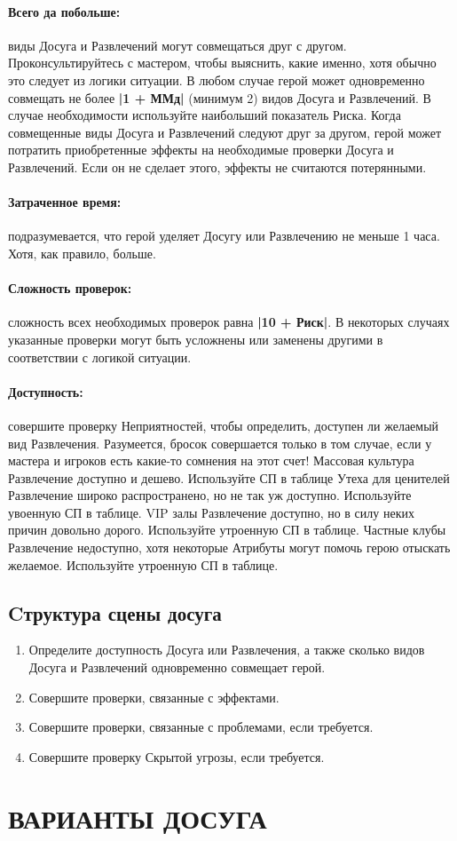 \paragraph{Всего да побольше:} виды Досуга и Развлечений могут совмещаться друг с другом. Проконсультируйтесь с мастером, чтобы выяснить, какие именно, хотя обычно это следует из логики ситуации. В любом случае герой может одновременно совмещать не более \textbf{|1 + ММд|} (минимум 2) видов Досуга и Развлечений. В случае необходимости используйте наибольший показатель Риска. Когда совмещенные виды Досуга и Развлечений следуют друг за другом, герой может потратить приобретенные эффекты на необходимые проверки Досуга и Развлечений. Если он не сделает этого, эффекты не считаются потерянными.
\paragraph{Затраченное время:} подразумевается, что герой уделяет Досугу или Развлечению не меньше 1 часа. Хотя, как правило, больше.
\paragraph{Сложность проверок:} сложность всех необходимых проверок равна \textbf{|10 + Риск|}. В некоторых случаях указанные проверки могут быть усложнены или заменены другими в соответствии с логикой ситуации.
\paragraph{Доступность:} совершите проверку Неприятностей, чтобы определить, доступен ли желаемый вид Развлечения. Разумеется, бросок совершается только в том случае, если у мастера и игроков есть какие-то сомнения на этот счет!
\trouble
{Массовая культура}%
{Развлечение доступно и дешево. Используйте СП в таблице}%
{Утеха для ценителей}%
{Развлечение широко распространено, но не так уж доступно. Используйте увоенную СП в таблице.}%
{VIP залы}%
{Развлечение доступно, но в силу неких причин довольно дорого. Используйте утроенную СП в таблице.}%
{Частные клубы}%
{Развлечение недоступно, хотя некоторые Атрибуты могут помочь герою отыскать желаемое. Используйте утроенную СП в таблице.}%
\subsection{Cтруктура сцены досуга}
\begin{enumerate}
\item Определите доступность Досуга или Развлечения, а также сколько видов Досуга и Развлечений одновременно совмещает герой.
\item Совершите проверки, связанные с эффектами.
\item Совершите проверки, связанные с проблемами, если требуется.
\item Совершите проверку Скрытой угрозы, если требуется.
\end{enumerate}
\section{ВАРИАНТЫ ДОСУГА}
